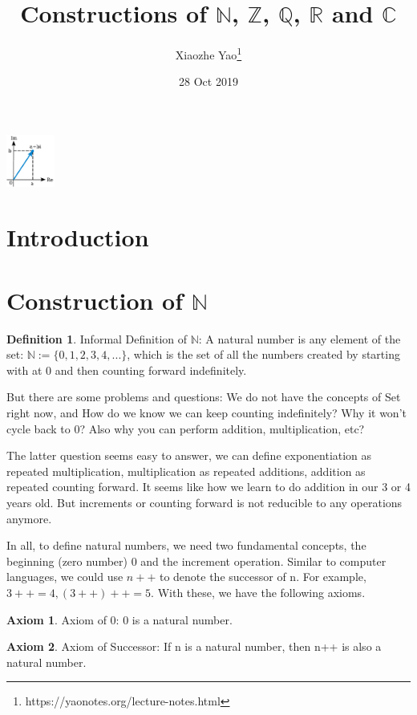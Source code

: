\documentclass{article}
\title{Constructions of $\mathbb{N}$, $\mathbb{Z}$, $\mathbb{Q}$, $\mathbb{R}$ and $\mathbb{C}$}
\author{Xiaozhe Yao\footnote{https://yaonotes.org/lecture-notes.html}}
\date{28 Oct 2019}
\theoremstyle{definition}
\newtheorem{defi}{Definition}[section]
\newtheorem{axiom}{Axiom}[section]
\begin{document}
\maketitle
\begin{center}
    \includegraphics[width=60px]{Analysis/images/complex-number.pdf}
\end{center}

\section{Introduction}


\section{Construction of $\mathbb{N}$}

\begin{defi}
Informal Definition of $\mathbb{N}$: A natural number is any element of the set: $\mathbb{N} := \{0,1,2,3,4,...\}$, which is the set of all the numbers created by starting with at $0$ and then counting forward indefinitely.
\end{defi}


But there are some problems and questions: We do not have the concepts of Set right now, and How do we know we can keep counting indefinitely? Why it won't cycle back to $0$? Also why you can perform addition, multiplication, etc?

The latter question seems easy to answer, we can define exponentiation as repeated multiplication, multiplication as repeated additions, addition as repeated counting forward. It seems like how we learn to do addition in our 3 or 4 years old. But increments or counting forward is not reducible to any operations anymore.

In all, to define natural numbers, we need two fundamental concepts, the beginning (zero number) $0$ and the increment operation. Similar to computer languages, we could use $n++$ to denote the successor of n. For example, $3++ = 4, (3++)++ = 5$. With these, we have the following axioms.

\begin{axiom}
Axiom of 0: 0 is a natural number.
\end{axiom}

\begin{axiom}
Axiom of Successor: If n is a natural number, then n++ is also a natural number.
\end{axiom}
\end{document}
